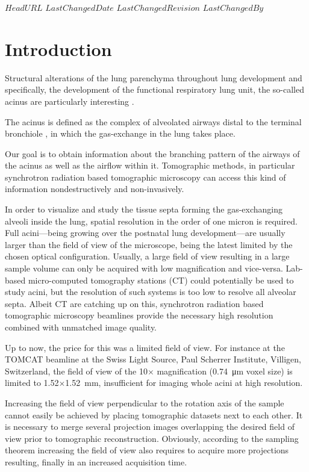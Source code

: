 \svnidlong
{$HeadURL$}
{$LastChangedDate$}
{$LastChangedRevision$}
{$LastChangedBy$}
%
\section{Introduction}
Structural alterations of the lung parenchyma throughout lung development and specifically, the development of the functional respiratory lung unit, the so-called acinus are particularly interesting \cite{Schittny2008,Mund2008,Tsuda2008}.

The acinus is defined as the complex of alveolated airways distal to the terminal bronchiole \cite{Rodriguez1987}, in which the gas-exchange in the lung takes place. 

Our goal is to obtain information about the branching pattern of the airways of the acinus as well as the airflow within it. Tomographic methods, in particular synchrotron radiation based tomographic microscopy can access this kind of information nondestructively and non-invasively. 

In order to visualize and study the tissue septa forming the gas-exchanging alveoli inside the lung, spatial resolution in the order of one micron is required. Full acini---being growing over the postnatal lung development---are usually larger than the field of view of the microscope, being the latest limited by the chosen optical configuration. Usually, a large field of view resulting in a large sample volume can only be acquired with low magnification and vice-versa. Lab-based micro-computed tomography stations (\micro CT) could potentially be used to study acini, but the resolution of such systems is too low to resolve all alveolar septa. Albeit \micro CT are catching up on this, synchrotron radiation based tomographic microscopy beamlines provide the necessary high resolution combined with unmatched image quality.

Up to now, the price for this was a limited field of view. For instance at the TOMCAT beamline \cite{Stampanoni2007} at the Swiss Light Source, Paul Scherrer Institute, Villigen, Switzerland, the field of view of the 10$\times$ magnification (\SI{0.74}{\micro\meter} voxel size) is limited to 1.52$\times$\SI{1.52}{\milli\meter}, insufficient for imaging whole acini at high resolution.

Increasing the field of view perpendicular to the rotation axis of the sample cannot easily be achieved by placing tomographic datasets next to each other. It is necessary to merge several projection images overlapping the desired field of view prior to tomographic reconstruction. Obviously, according to the sampling theorem increasing the field of view also requires to acquire more projections resulting, finally in an increased acquisition time.

